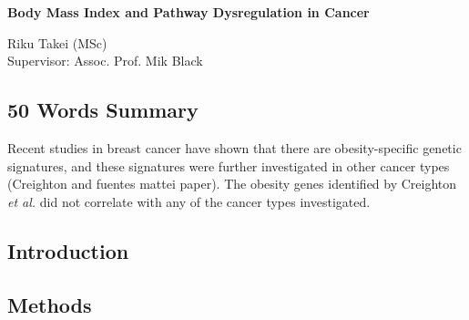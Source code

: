 \documentclass[12pt, a4paper]{article}
\begin{document}
\begin{center}
\Large{\textbf{Body Mass Index and Pathway Dysregulation in Cancer}}\\
\end{center}

\begin{center}
Riku Takei (MSc)\\
Supervisor: Assoc. Prof. Mik Black
\end{center}

\subsection*{50 Words Summary}

Recent studies in breast cancer have shown that there are obesity-specific genetic signatures, and these signatures were further investigated in other cancer types (Creighton and fuentes mattei paper).
The obesity genes identified by Creighton \textit{et al.} did not correlate with any of the cancer types investigated.

\subsection*{Introduction}



\newpage

\subsection*{Methods}
\end{document}
